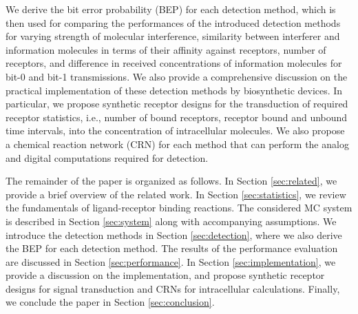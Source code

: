 \documentclass[twocolumn]{IEEEtran}
\begin{document}
We derive the bit error probability (BEP) for each detection method, which is then used for comparing the performances of the introduced detection methods for varying strength of molecular interference, similarity between interferer and information molecules in terms of their affinity against receptors, number of receptors, and difference in received concentrations of information molecules for bit-0 and bit-1 transmissions. 
We also provide a comprehensive discussion on the practical implementation of these detection methods by biosynthetic devices. In particular, we propose synthetic receptor designs for the transduction of required receptor statistics, i.e., number of bound receptors, receptor bound and unbound time intervals,  into the concentration of intracellular molecules. We also propose a chemical reaction network (CRN) for each method that can perform the analog and digital computations required for detection. 


The remainder of the paper is organized as follows. In Section \ref{sec:related}, we provide a brief overview of the related work. In Section \ref{sec:statistics}, we review the fundamentals of ligand-receptor binding reactions. The considered MC system is described in Section \ref{sec:system} along with accompanying assumptions.  We introduce the detection methods in Section \ref{sec:detection}, where we also derive the BEP for each detection method. The results of the performance evaluation are discussed in Section \ref{sec:performance}. In Section \ref{sec:implementation}, we provide a discussion on the implementation, and propose synthetic receptor designs for signal transduction and CRNs for intracellular calculations. Finally, we conclude the paper in Section \ref{sec:conclusion}.



\end{document}
